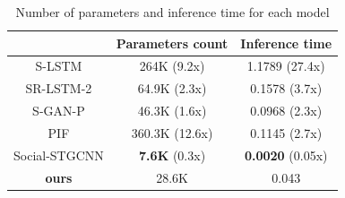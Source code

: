 \begin{table}[hbtp]
  \centering
  \caption{Number of parameters and inference time for each model\protect\footnotemark[6]}
  \label{tab:param-results}
  \begin{tabular}{c||c|c}
   & Parameters count & Inference time \\
  \hline\hline
  S-LSTM \cite{s-lstm} & 264K {\color{blue}(9.2x)} & 1.1789 {\color{blue}(27.4x)} \\
  \hline
  SR-LSTM-2 \cite{sr-lstm} & 64.9K {\color{blue}(2.3x)} & 0.1578 {\color{blue}(3.7x)} \\
  \hline
  S-GAN-P \cite{gupta2018social-s-gan-p} & 46.3K {\color{blue}(1.6x)} & 0.0968 {\color{blue}(2.3x)} \\
  \hline
  PIF \cite{liang2019peeking-pif} & 360.3K {\color{blue}(12.6x)} & 0.1145 {\color{blue}(2.7x)} \\
  \hline
  Social-STGCNN \cite{s-stgcnn} & \textbf{7.6K} {\color{blue}(0.3x)} & \textbf{0.0020} {\color{blue}(0.05x)} \\
  \hline \hline
  \textbf{ours} & 28.6K & 0.043 \\
  \hline 
  \end{tabular}
\end{table}

\protect{}

\newpage
